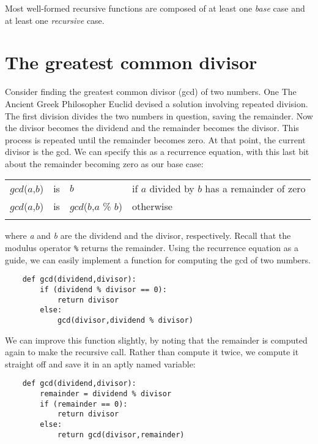 Most well-formed recursive functions are composed of
at least one {\it base} case and at least one {\it recursive} case.

\section{The greatest common divisor}

Consider finding the greatest common divisor (gcd) of two numbers. One
The Ancient Greek Philosopher Euclid devised a solution involving
repeated division.
The first division divides the two
numbers in question, saving the remainder. Now the divisor becomes
the dividend and the
remainder becomes the divisor. This process is repeated until
the remainder becomes zero.
At that
point, the current divisor is the gcd.
We can specify this as a recurrence equation, with this last bit about
the remainder becoming zero as our base case:

\begin{center}
\begin{tabular}{lcll}%
\T\toprule
    $gcd$($a$,$b$) & is & $b$ & if $a$ divided by $b$ has a remainder of zero\\
    $gcd$($a$,$b$) & is & $gcd$($b$,$a$ \% $b$) & otherwise \T\\
\T\bottomrule
\end{tabular}
\end{center}

where {\it a} and {\it b} are the dividend and the divisor, respectively.
Recall that the modulus operator \verb!%! returns the remainder.
Using the recurrence equation as a guide, we can easily implement
a function for computing the gcd of two numbers.

\begin{verbatim}
    def gcd(dividend,divisor):
        if (dividend % divisor == 0):
            return divisor
        else:
            gcd(divisor,dividend % divisor)
\end{verbatim}

We can improve this function slightly, by noting that
the remainder is computed again to make the recursive call.
Rather than compute it twice, we compute it straight off
and save it in an aptly named variable:

\begin{verbatim}
    def gcd(dividend,divisor):
        remainder = dividend % divisor
        if (remainder == 0):
            return divisor
        else:
            return gcd(divisor,remainder)
\end{verbatim}

